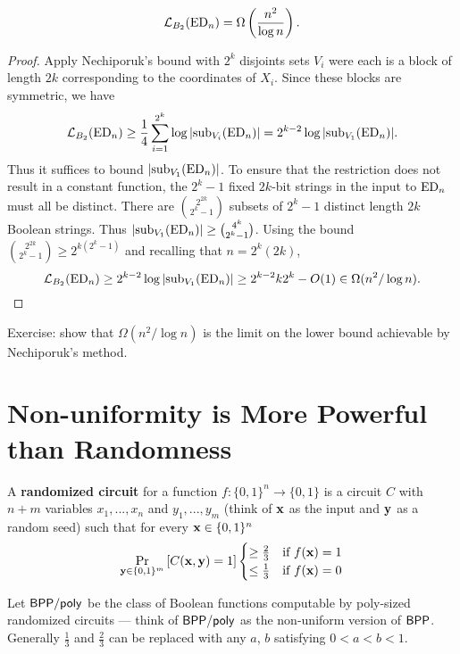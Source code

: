 \documentclass[11pt]{article}
\begin{document}
	\begin{theorem}
		\label{thm:L-B2FormulaQuadraticExplicit}
		\[\mathcal{L}_{B_2}(\mathrm{ED}_n) = \Omega\left(\frac{n^2}{\log n}\right).\]
	\end{theorem}
	\begin{proof}
		Apply Nechiporuk's bound with $2^k$ disjoints sets $V_i$ were each is a block of length $2k$ corresponding to the coordinates of $X_i$. Since these blocks are symmetric, we have
		\[\mathcal{L}_{B_2}(\mathrm{ED}_n) \geq \frac{1}{4}\sum_{i=1}^{2^k}\log |\mathrm{sub}_{V_i}(\mathrm{ED}_n)| = 2^{k-2}\log|\mathrm{sub}_{V_1}(\mathrm{ED}_n)|.\]
		Thus it suffices to bound $|\mathrm{sub}_{V_1}(\mathrm{ED}_n)|$. To ensure that the restriction does not result in a constant function, the $2^k-1$ fixed $2k$-bit strings in the input to $\mathrm{ED}_n$ must all be distinct. There are $\binom{2^{2k}}{2^k-1}$ subsets of $2^k - 1$ distinct length $2k$ Boolean strings. Thus $|\mathrm{sub}_{V_1}(\mathrm{ED}_n)| \geq \binom{4^k}{2^k-1}$. Using the bound $\binom{2^{2k}}{2^k-1} \geq 2^{k(2^k - 1)}$ and recalling that $n = 2^k(2k)$, 
		\[\mathcal{L}_{B_2}(\mathrm{ED}_n) \geq 2^{k-2}\log|\mathrm{sub}_{V_1}(\mathrm{ED}_n)| \geq 2^{k-2}k2^k - O(1) \in \Omega(n^2/\log n).\]  
	\end{proof}
	Exercise: show that $\Omega(n^2/\log n)$ is the limit on the lower bound achievable by Nechiporuk's method.
	

\section{Non-uniformity is More Powerful than Randomness}
	\begin{definition}
		\label{def:randomizedcircuit}
		A \textbf{randomized circuit} for a function $f: \{0,1\}^n \rightarrow \{0,1\}$ is a circuit $C$ with $n + m$ variables $x_1, ..., x_n$ and $y_1, ..., y_m$ (think of $\mathbf{x}$ as the input and $\mathbf{y}$ as a random seed) such that for every $\mathbf{x} \in \{0,1\}^n$
		\[\Pr_{\mathbf{y} \in \{0,1\}^m}\left[C(\mathbf{x}, \mathbf{y}) = 1\right] \begin{cases}
		\geq \frac{2}{3} &\mbox{if $f(\mathbf{x}) = 1$}\\
		\leq \frac{1}{3} &\mbox{if $f(\mathbf{x}) = 0$}
		\end{cases}\]
	\end{definition}
	Let $\mathsf{BPP/poly}$ be the class of Boolean functions computable by poly-sized randomized circuits --- think of $\mathsf{BPP/poly}$ as the non-uniform version of $\mathsf{BPP}$. Generally $\frac{1}{3}$ and $\frac{2}{3}$ can be replaced with any $a$, $b$ satisfying $0 < a < b < 1$. 
	
\end{document}
